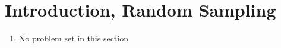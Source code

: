 \section{Introduction, Random Sampling}

\begin{enumerate}
    \item No problem set in this section
\end{enumerate}